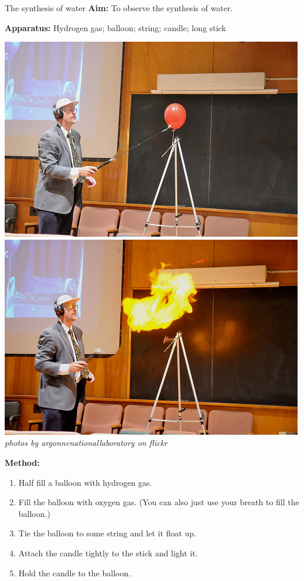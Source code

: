            \begin{g_experiment}{The synthesis of water}
            \nopagebreak
            \label{m38709*id63175}\noindent{}\textbf{Aim:}\newline
    To observe the synthesis of water.\par 
        \label{m38709*id63194}\noindent{}\textbf{Apparatus:}\newline
    Hydrogen gas; balloon; string; candle; long stick\par 
      \label{m38709*id63199}
    \setcounter{subfigure}{0}
    \begin{center}
\includegraphics[width=.3\textwidth]{photos/hydrogen_balloon1.jpg} 
\includegraphics[width=.3\textwidth]{photos/hydrogen_balloon2_argonnenationallaboratory.jpg} \\
\textsl{photos by argonnenationallaboratory on flickr}
    \end{center}
        \label{m38709*id63206}\noindent{}\textbf{Method:}\label{m38709*id63212}\begin{enumerate}[noitemsep, label=\textbf{\arabic*}. ] 
\item Half fill a balloon with hydrogen gas.
\item Fill the balloon with oxygen gas. (You can also just use your breath to fill the balloon.)
\item Tie the balloon to some string and let it float up.
\item Attach the candle tightly to the stick and light it.
\item Hold the candle to the balloon.
\end{enumerate}

\end{g_experiment}
